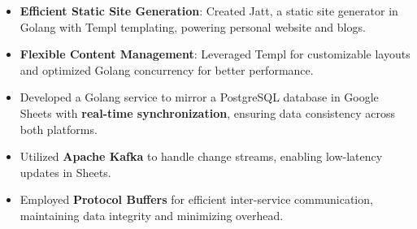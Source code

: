 \documentclass[10pt,a4paper,ragged2e,withhyper]{altacv}
\begin{document}
\begin{paracol}{2}
\divider

\begin{itemize}
\item \textbf{Efficient Static Site Generation}: Created Jatt, a static site generator in Golang with Templ templating, powering personal website and blogs.
\item \textbf{Flexible Content Management}: Leveraged Templ for customizable layouts and optimized Golang concurrency for better performance.
\end{itemize}

\divider

\begin{itemize}
    \item Developed a Golang service to mirror a PostgreSQL database in Google Sheets with \textbf{real-time synchronization}, ensuring data consistency across both platforms.
    \item Utilized \textbf{Apache Kafka} to handle change streams, enabling low-latency updates in Sheets.
    \item Employed \textbf{Protocol Buffers} for efficient inter-service communication, maintaining data integrity and minimizing overhead.
\end{itemize}

\medskip

\end{paracol}
\end{document}
